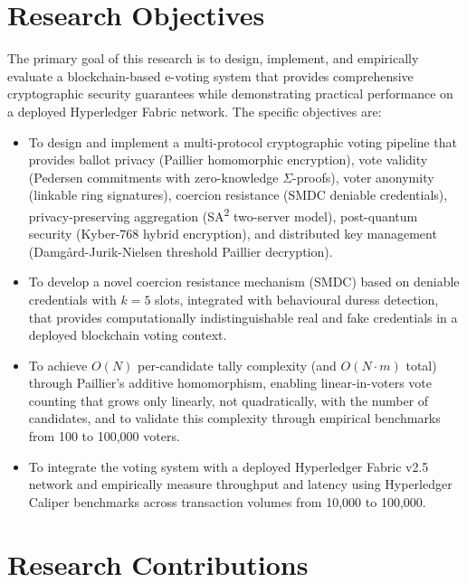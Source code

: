 \section{Research Objectives}
\label{sec:research-objectives}

The primary goal of this research is to design, implement, and empirically evaluate a blockchain-based e-voting system that provides comprehensive cryptographic security guarantees while demonstrating practical performance on a deployed Hyperledger Fabric network. The specific objectives are:

\begin{itemize}
    \item To design and implement a multi-protocol cryptographic voting pipeline that provides ballot privacy (Paillier homomorphic encryption), vote validity (Pedersen commitments with zero-knowledge $\Sigma$-proofs), voter anonymity (linkable ring signatures), coercion resistance (SMDC deniable credentials), privacy-preserving aggregation (SA\textsuperscript{2} two-server model), post-quantum security (Kyber-768 hybrid encryption), and distributed key management (Damg\aa rd-Jurik-Nielsen threshold Paillier decryption).

    \item To develop a novel coercion resistance mechanism (SMDC) based on deniable credentials with $k=5$ slots, integrated with behavioural duress detection, that provides computationally indistinguishable real and fake credentials in a deployed blockchain voting context.

    \item To achieve $O(N)$ per-candidate tally complexity (and $O(N \cdot m)$ total) through Paillier's additive homomorphism, enabling linear-in-voters vote counting that grows only linearly, not quadratically, with the number of candidates, and to validate this complexity through empirical benchmarks from 100 to 100{,}000 voters.

    \item To integrate the voting system with a deployed Hyperledger Fabric v2.5 network and empirically measure throughput and latency using Hyperledger Caliper benchmarks across transaction volumes from 10{,}000 to 100{,}000.
\end{itemize}

\section{Research Contributions}
\label{sec:contributions}

